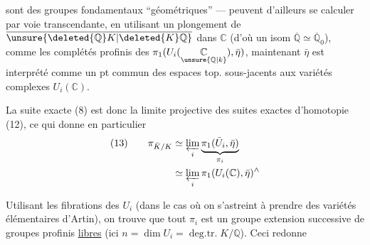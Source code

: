 sont des groupes fondamentaux ``géométriques'' ---  peuvent d'ailleurs se calculer par voie transcendante, en utilisant un plongement de $\overline{\unsure{\deleted{\mathbb Q}K|\deleted{K}\mathbb Q}}$ dans $\mathbb C$ (d'où un isom $\overline{\mathbb Q}\simeq\overline{\mathbb Q}_0$), comme les complétés profinis des $\pi_1(U_i(\underset{\unsure{\mathbb Q|k}}{\mathbb C}),\bar\eta)$,  maintenant $\bar\eta$ est interprété comme un pt  commun des espaces top. sous-jacents aux variétés complexes $U_i(\mathbb C)$.

La suite exacte (8) est donc la limite projective des suites exactes d'homotopie (12), ce qui donne en particulier
\[
\begin{aligned}
(13)\qquad \pi_{\bar K/K}&\simeq\varprojlim_i\underbrace{\pi_1(\bar U_i,\bar\eta)}_{\pi_i}\\
&\simeq\varprojlim_i\pi_1(U_i(\mathbb C),\bar\eta)^{\wedge}
\end{aligned}
\]

Utilisant les fibrations des $U_i$ (dans le cas où on s'astreint à prendre des variétés élémentaires d'Artin), on trouve que tout $\pi_i$ est un groupe  extension successive de  groupes profinis \uline{libres} (ici $n=\dim U_i=\operatorname{deg.tr.}K/\mathbb Q$). Ceci redonne
